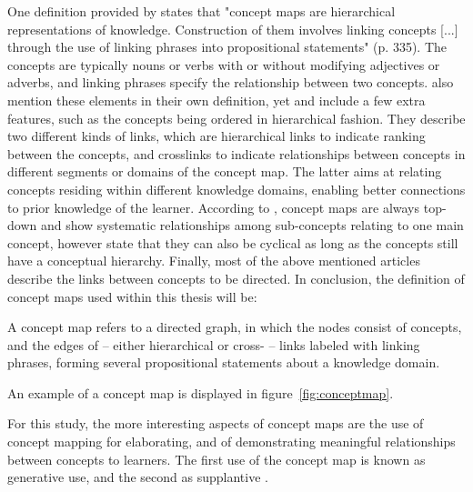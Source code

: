 One definition provided by  states that "concept maps are hierarchical representations of knowledge. Construction of them involves linking concepts [...] through the use of linking phrases into propositional statements" (p. 335). The concepts are typically nouns or verbs with or without modifying adjectives or adverbs, and linking phrases specify the relationship between two concepts.  also mention these elements in their own definition, yet  and  include a few extra features, such as the concepts being ordered in hierarchical fashion. They describe two different kinds of links, which are hierarchical links to indicate ranking between the concepts, and crosslinks to indicate relationships between concepts in different segments or domains of the concept map. The latter aims at relating concepts residing within different knowledge domains, enabling better connections to prior knowledge of the learner. According to , concept maps are always top-down and show systematic relationships among sub-concepts relating to one main concept, however  state that they can also be cyclical as long as the concepts still have a conceptual hierarchy. Finally, most of the above mentioned articles describe the links between concepts to be directed. In conclusion, the definition of concept maps used within this thesis will be:

\begin{definition}
    A concept map refers to a directed graph, in which the nodes consist of concepts, and the edges of -- either hierarchical or cross- -- links labeled with linking phrases, forming several propositional statements about a knowledge domain.
\end{definition}

\noindent An example of a concept map is displayed in figure~\ref{fig:conceptmap}.

For this study, the more interesting aspects of concept maps are the use of concept mapping for elaborating, and of demonstrating meaningful relationships between concepts to learners. The first use of the concept map is known as generative use, and the second as supplantive \cite{instructionaldesign}.

